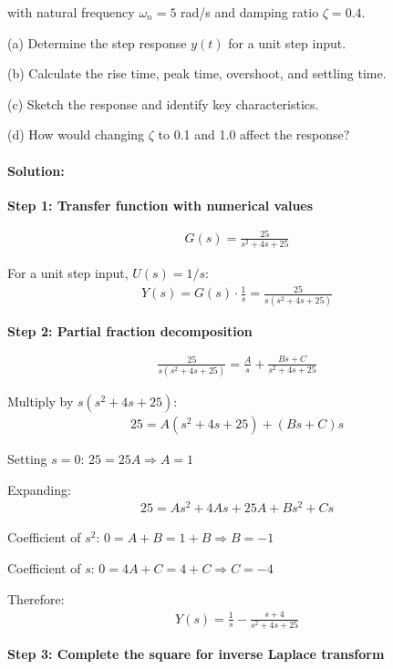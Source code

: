 \documentclass[11pt,a4paper]{article}
\begin{document}
with natural frequency $\omega_n = 5$ rad/s and damping ratio $\zeta = 0.4$.

(a) Determine the step response $y(t)$ for a unit step input.

(b) Calculate the rise time, peak time, overshoot, and settling time.

(c) Sketch the response and identify key characteristics.

(d) How would changing $\zeta$ to 0.1 and 1.0 affect the response?

\paragraph{Solution:}

\textbf{Step 1: Transfer function with numerical values}

\begin{align}
G(s) = \frac{25}{s^2 + 4s + 25}
\end{align}

For a unit step input, $U(s) = 1/s$:
\begin{align}
Y(s) = G(s) \cdot \frac{1}{s} = \frac{25}{s(s^2 + 4s + 25)}
\end{align}

\textbf{Step 2: Partial fraction decomposition}

\begin{align}
\frac{25}{s(s^2 + 4s + 25)} = \frac{A}{s} + \frac{Bs + C}{s^2 + 4s + 25}
\end{align}

Multiply by $s(s^2 + 4s + 25)$:
\begin{align}
25 = A(s^2 + 4s + 25) + (Bs + C)s
\end{align}

Setting $s = 0$: $25 = 25A \Rightarrow A = 1$

Expanding:
\begin{align}
25 = As^2 + 4As + 25A + Bs^2 + Cs
\end{align}

Coefficient of $s^2$: $0 = A + B = 1 + B \Rightarrow B = -1$

Coefficient of $s$: $0 = 4A + C = 4 + C \Rightarrow C = -4$

Therefore:
\begin{align}
Y(s) = \frac{1}{s} - \frac{s + 4}{s^2 + 4s + 25}
\end{align}

\textbf{Step 3: Complete the square for inverse Laplace transform}
\end{document}
